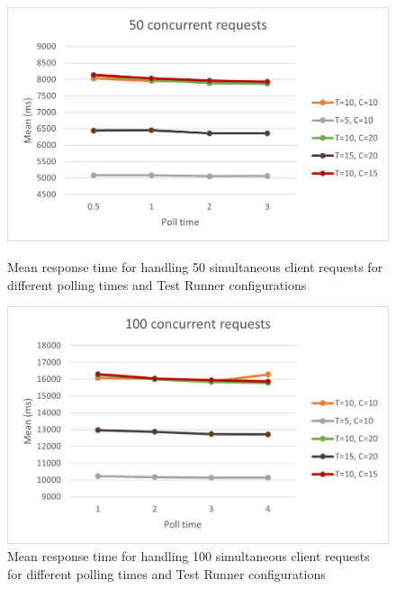 \begin{figure}[!tbp]
\begin{minipage}[t]{0.4\textwidth}
    \centering
    \includegraphics[scale=0.65]{images/50.png}
    \caption{Mean response time for handling 50 simultaneous client requests for different polling times and Test Runner configurations}
  \end{minipage}
  \hfill
  \begin{minipage}[t]{0.4\textwidth}
    \centering
    \includegraphics[scale=0.65]{images/100.png}
    \caption{Mean response time for handling 100 simultaneous client requests for different polling times and Test Runner configurations}
    \label{fig:resultEnd}
  \end{minipage}
\end{figure}

